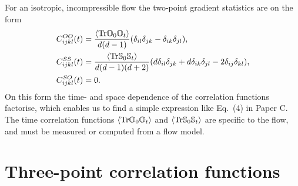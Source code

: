 \documentclass[thesis.tex]{subfiles}
\begin{document}
For an isotropic, incompressible flow the two-point gradient statistics are on the form
\begin{align}
	C^{OO}_{ijkl}(t) &= \frac{\left\langle \tr \ma O_0\ma O_t\right\rangle}{d(d-1)}( \delta_{il}\delta_{jk}-\delta_{ik}\delta_{jl}), \nn\\
	C^{SS}_{ijkl}(t) &= \frac{\left\langle \tr \ma S_0\ma S_t\right\rangle}{d(d-1)(d+2)}(d\delta_{il}\delta_{jk} + d\delta_{ik}\delta_{jl} - 2\delta_{ij}\delta_{kl}), \nn\\
	C^{SO}_{ijkl}(t) &= 0. \eqnlab{turbjpoint}
\end{align}
On this form the time- and space dependence of the correlation functions factorise, which enables us to find a simple expression like Eq.~(4) in Paper C. The time correlation functions $\left\langle \mbox{Tr} \mathbb{O}_0\mathbb{O}_t\right\rangle$ and $\left\langle \mbox{Tr} \mathbb{S}_0\mathbb{S}_t\right\rangle$ are specific to the flow, and must be measured or computed from a flow model.

\section{Three-point correlation functions}
\end{document}
